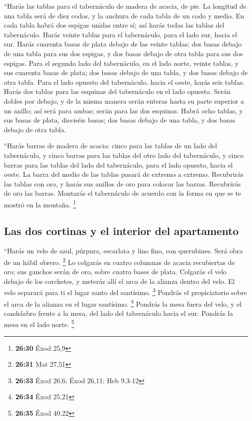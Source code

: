 \begin{paracol}{2}
 ``Harás las tablas para el tabernáculo de madera de
acacia, de pie.  La longitud de una tabla será de diez
codos, y la anchura de cada tabla de un codo y medio.  En
cada tabla habrá dos espigas unidas entre sí; así harás todas las tablas
del tabernáculo.  Harás veinte tablas para el
tabernáculo, para el lado sur, hacia el sur.  Harás
cuarenta basas de plata debajo de las veinte tablas; dos basas debajo de
una tabla para sus dos espigas, y dos basas debajo de otra tabla para
sus dos espigas.  Para el segundo lado del tabernáculo,
en el lado norte, veinte tablas,  y sus cuarenta basas de
plata; dos basas debajo de una tabla, y dos basas debajo de otra tabla.
 Para el lado opuesto del tabernáculo, hacia el oeste,
harás seis tablas.  Harás dos tablas para las esquinas
del tabernáculo en el lado opuesto.  Serán dobles por
debajo, y de la misma manera serán enteras hasta su parte superior a un
anillo; así será para ambas; serán para las dos esquinas.
 Habrá ocho tablas, y sus basas de plata, dieciséis
basas; dos basas debajo de una tabla, y dos basas debajo de otra tabla.

 ``Harás barras de madera de acacia: cinco para las
tablas de un lado del tabernáculo,  y cinco barras para
las tablas del otro lado del tabernáculo, y cinco barras para las tablas
del lado del tabernáculo, para el lado opuesto, hacia el oeste.
 La barra del medio de las tablas pasará de extremo a
extremo.  Recubrirás las tablas con oro, y harás sus
anillos de oro para colocar las barras. Recubrirás de oro las barras.
 Montarás el tabernáculo de acuerdo con la forma en que
se te mostró en la montaña. \footnote{\textbf{26:30} Éxod 25,9}

\hypertarget{las-dos-cortinas-y-el-interior-del-apartamento}{%
\subsection{Las dos cortinas y el interior del
apartamento}\label{las-dos-cortinas-y-el-interior-del-apartamento}}

 ``Harás un velo de azul, púrpura, escarlata y lino fino,
con querubines. Será obra de un hábil obrero. \footnote{\textbf{26:31}
  Mat 27,51}  Lo colgarás en cuatro columnas de acacia
recubiertas de oro; sus ganchos serán de oro, sobre cuatro bases de
plata.  Colgarás el velo debajo de los corchetes, y
meterás allí el arca de la alianza dentro del velo. El velo separará
para ti el lugar santo del santísimo. \footnote{\textbf{26:33} Éxod
  26,6; Éxod 26,11; Heb 9,3-12}  Pondrás el propiciatorio
sobre el arca de la alianza en el lugar santísimo. \footnote{\textbf{26:34}
  Éxod 25,21}  Pondrás la mesa fuera del velo, y el
candelabro frente a la mesa, del lado del tabernáculo hacia el sur.
Pondrás la mesa en el lado norte. \footnote{\textbf{26:35} Éxod 40,22}


\end{paracol}
